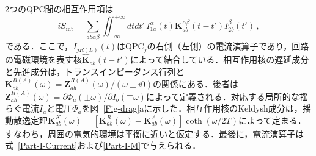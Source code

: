 \documentclass[a4paper,11pt]{ltjsarticle}
\begin{document}
2つのQPC間の相互作用項は
\begin{equation}\label{Part-I-Action-int}
iS_{\mathrm{int}}=\sum_{ab\alpha\beta}\iint^{+\infty}_{-\infty}dtdt'\,
I^{\alpha}_{1a}(t)\mathbf{K}^{\alpha\beta}_{ab}(t-t')I^{\beta}_{2b}(t')\,,
\end{equation}
である．ここで，$I_{jR(L)}(t)$はQPC$_j$の右側（左側）の電流演算子であり，回路の電磁環境を表す核$\hat{\mathbf{K}}_{ab}(t-t')$によって結合している．相互作用核の遅延成分と先進成分は，トランスインピーダンス行列と$\mathbf{K}^{R(A)}_{ab}(\omega)=\mathbf{Z}^{R(A)}_{ab}(\omega)/(\omega\pm
i0)$の関係にある．後者は$\mathbf{Z}^{R(A)}_{ab}(\omega)=\partial\Phi_{a}(\pm
\omega)/\partial I_{b}(\mp \omega)$によって定義される．対応する局所的な揺らぐ電流$I_a$と電圧$\Phi_a$を図~\ref{Fig-drag}aに示した．相互作用核のKeldysh成分は，揺動散逸定理$\mathbf{K}^{K}_{ab}(\omega)=[\mathbf{K}^{R}_{ab}(\omega)-
\mathbf{K}^{A}_{ab}(\omega)]\coth(\omega/2T)$によって定まる．すなわち，周囲の電気的環境は平衡に近いと仮定する．最後に，電流演算子は式~\eqref{Part-I-Current}および\eqref{Part-I-M}で与えられる．
\end{document}

